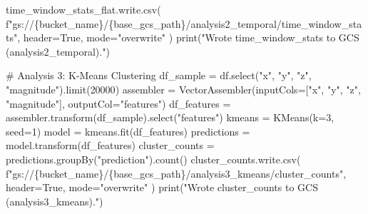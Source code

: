 \documentclass[
  letterpaper,
  DIV=11,
  numbers=noendperiod]{scrartcl}
\newenvironment{Shaded}{\begin{snugshade}}{\end{snugshade}}
\newcommand{\BuiltInTok}[1]{\textcolor[rgb]{0.98,0.46,0.51}{#1}}
\newcommand{\CommentTok}[1]{\textcolor[rgb]{0.42,0.45,0.49}{#1}}
\newcommand{\DecValTok}[1]{\textcolor[rgb]{0.47,0.72,1.00}{#1}}
\newcommand{\NormalTok}[1]{\textcolor[rgb]{0.88,0.89,0.91}{#1}}
\newcommand{\OperatorTok}[1]{\textcolor[rgb]{0.88,0.89,0.91}{#1}}
\newcommand{\SpecialCharTok}[1]{\textcolor[rgb]{0.47,0.72,1.00}{#1}}
\newcommand{\SpecialStringTok}[1]{\textcolor[rgb]{0.62,0.80,1.00}{#1}}
\newcommand{\StringTok}[1]{\textcolor[rgb]{0.62,0.80,1.00}{#1}}
\newcommand{\VariableTok}[1]{\textcolor[rgb]{1.00,0.67,0.44}{#1}}
\begin{document}
\begin{Shaded}
\begin{Highlighting}[]
\NormalTok{    time\_window\_stats\_flat.write.csv(}
        \SpecialStringTok{f"gs://}\SpecialCharTok{\{}\NormalTok{bucket\_name}\SpecialCharTok{\}}\SpecialStringTok{/}\SpecialCharTok{\{}\NormalTok{base\_gcs\_path}\SpecialCharTok{\}}\SpecialStringTok{/analysis2\_temporal/time\_window\_stats"}\NormalTok{,}
\NormalTok{        header}\OperatorTok{=}\VariableTok{True}\NormalTok{,}
\NormalTok{        mode}\OperatorTok{=}\StringTok{"overwrite"}
\NormalTok{    )}
    \BuiltInTok{print}\NormalTok{(}\StringTok{"Wrote time\_window\_stats to GCS (analysis2\_temporal)."}\NormalTok{)}

    \CommentTok{\# Analysis 3: K{-}Means Clustering}
\NormalTok{    df\_sample }\OperatorTok{=}\NormalTok{ df.select(}\StringTok{"x"}\NormalTok{, }\StringTok{"y"}\NormalTok{, }\StringTok{"z"}\NormalTok{, }\StringTok{"magnitude"}\NormalTok{).limit(}\DecValTok{20000}\NormalTok{)}
\NormalTok{    assembler }\OperatorTok{=}\NormalTok{ VectorAssembler(inputCols}\OperatorTok{=}\NormalTok{[}\StringTok{"x"}\NormalTok{, }\StringTok{"y"}\NormalTok{, }\StringTok{"z"}\NormalTok{, }\StringTok{"magnitude"}\NormalTok{], outputCol}\OperatorTok{=}\StringTok{"features"}\NormalTok{)}
\NormalTok{    df\_features }\OperatorTok{=}\NormalTok{ assembler.transform(df\_sample).select(}\StringTok{"features"}\NormalTok{)}
\NormalTok{    kmeans }\OperatorTok{=}\NormalTok{ KMeans(k}\OperatorTok{=}\DecValTok{3}\NormalTok{, seed}\OperatorTok{=}\DecValTok{1}\NormalTok{)}
\NormalTok{    model }\OperatorTok{=}\NormalTok{ kmeans.fit(df\_features)}
\NormalTok{    predictions }\OperatorTok{=}\NormalTok{ model.transform(df\_features)}
\NormalTok{    cluster\_counts }\OperatorTok{=}\NormalTok{ predictions.groupBy(}\StringTok{"prediction"}\NormalTok{).count()}
\NormalTok{    cluster\_counts.write.csv(}
        \SpecialStringTok{f"gs://}\SpecialCharTok{\{}\NormalTok{bucket\_name}\SpecialCharTok{\}}\SpecialStringTok{/}\SpecialCharTok{\{}\NormalTok{base\_gcs\_path}\SpecialCharTok{\}}\SpecialStringTok{/analysis3\_kmeans/cluster\_counts"}\NormalTok{,}
\NormalTok{        header}\OperatorTok{=}\VariableTok{True}\NormalTok{,}
\NormalTok{        mode}\OperatorTok{=}\StringTok{"overwrite"}
\NormalTok{    )}
    \BuiltInTok{print}\NormalTok{(}\StringTok{"Wrote cluster\_counts to GCS (analysis3\_kmeans)."}\NormalTok{)}


\end{Highlighting}
\end{Shaded}
\end{document}
